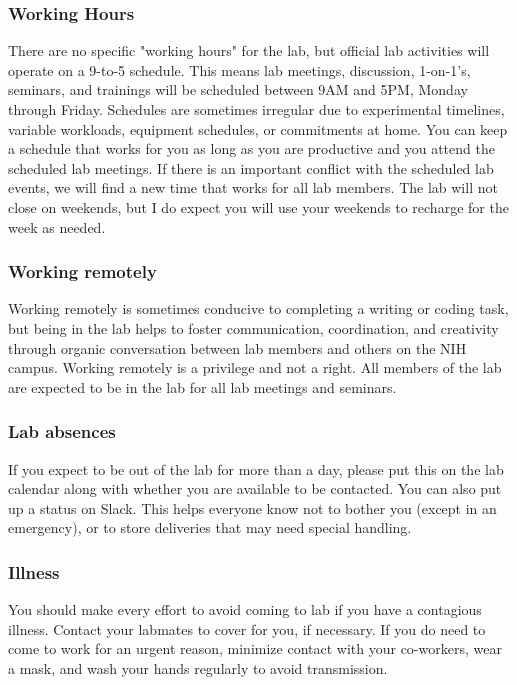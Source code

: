 \documentclass[10pt, letterpaper, twocolumn]{article} %
\begin{document}
\subsubsection{Working Hours}
There are no specific "working hours" for the lab, but official lab activities will operate on a 9-to-5 schedule. This means lab meetings, discussion, 1-on-1's, seminars, and trainings will be scheduled between 9AM and 5PM, Monday through Friday. Schedules are sometimes irregular due to experimental timelines, variable workloads, equipment schedules, or commitments at home. You can keep a schedule that works for you as long as you are productive and you attend the scheduled lab meetings. If there is an important conflict with the scheduled lab events, we will find a new time that works for all lab members. The lab will not close on weekends, but I do expect you will use your weekends to recharge for the week as needed.

\subsubsection{Working remotely} Working remotely is sometimes conducive to completing a writing or coding task, but being in the lab helps to foster communication, coordination, and creativity through organic conversation between lab members and others on the NIH campus. Working remotely is a privilege and not a right. All members of the lab are expected to be in the lab for all lab meetings and seminars.

\subsubsection{Lab absences} If you expect to be out of the lab for more than a day, please put this on the lab calendar along with whether you are available to be contacted. You can also put up a status on Slack. This helps everyone know not to bother you (except in an emergency), or to store deliveries that may need special handling.

\subsubsection{Illness} You should make every effort to avoid coming to lab if you have a contagious illness. Contact your labmates to cover for you, if necessary. If you do need to come to work for an urgent reason, minimize contact with your co-workers, wear a mask, and wash your hands regularly to avoid transmission.
\end{document}
